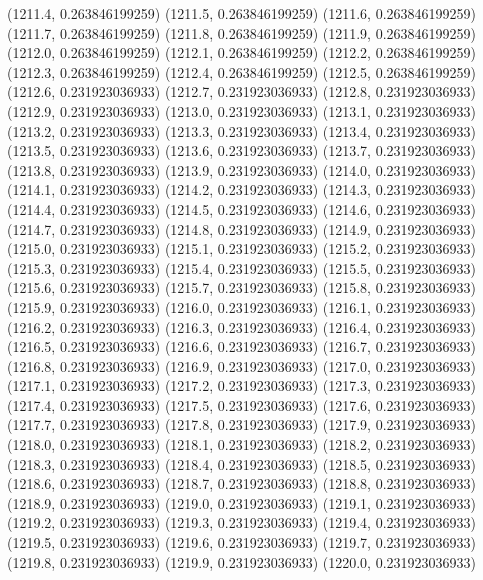 {					(1211.4, 0.263846199259)
					(1211.5, 0.263846199259)
					(1211.6, 0.263846199259)
					(1211.7, 0.263846199259)
					(1211.8, 0.263846199259)
					(1211.9, 0.263846199259)
					(1212.0, 0.263846199259)
					(1212.1, 0.263846199259)
					(1212.2, 0.263846199259)
					(1212.3, 0.263846199259)
					(1212.4, 0.263846199259)
					(1212.5, 0.263846199259)
					(1212.6, 0.231923036933)
					(1212.7, 0.231923036933)
					(1212.8, 0.231923036933)
					(1212.9, 0.231923036933)
					(1213.0, 0.231923036933)
					(1213.1, 0.231923036933)
					(1213.2, 0.231923036933)
					(1213.3, 0.231923036933)
					(1213.4, 0.231923036933)
					(1213.5, 0.231923036933)
					(1213.6, 0.231923036933)
					(1213.7, 0.231923036933)
					(1213.8, 0.231923036933)
					(1213.9, 0.231923036933)
					(1214.0, 0.231923036933)
					(1214.1, 0.231923036933)
					(1214.2, 0.231923036933)
					(1214.3, 0.231923036933)
					(1214.4, 0.231923036933)
					(1214.5, 0.231923036933)
					(1214.6, 0.231923036933)
					(1214.7, 0.231923036933)
					(1214.8, 0.231923036933)
					(1214.9, 0.231923036933)
					(1215.0, 0.231923036933)
					(1215.1, 0.231923036933)
					(1215.2, 0.231923036933)
					(1215.3, 0.231923036933)
					(1215.4, 0.231923036933)
					(1215.5, 0.231923036933)
					(1215.6, 0.231923036933)
					(1215.7, 0.231923036933)
					(1215.8, 0.231923036933)
					(1215.9, 0.231923036933)
					(1216.0, 0.231923036933)
					(1216.1, 0.231923036933)
					(1216.2, 0.231923036933)
					(1216.3, 0.231923036933)
					(1216.4, 0.231923036933)
					(1216.5, 0.231923036933)
					(1216.6, 0.231923036933)
					(1216.7, 0.231923036933)
					(1216.8, 0.231923036933)
					(1216.9, 0.231923036933)
					(1217.0, 0.231923036933)
					(1217.1, 0.231923036933)
					(1217.2, 0.231923036933)
					(1217.3, 0.231923036933)
					(1217.4, 0.231923036933)
					(1217.5, 0.231923036933)
					(1217.6, 0.231923036933)
					(1217.7, 0.231923036933)
					(1217.8, 0.231923036933)
					(1217.9, 0.231923036933)
					(1218.0, 0.231923036933)
					(1218.1, 0.231923036933)
					(1218.2, 0.231923036933)
					(1218.3, 0.231923036933)
					(1218.4, 0.231923036933)
					(1218.5, 0.231923036933)
					(1218.6, 0.231923036933)
					(1218.7, 0.231923036933)
					(1218.8, 0.231923036933)
					(1218.9, 0.231923036933)
					(1219.0, 0.231923036933)
					(1219.1, 0.231923036933)
					(1219.2, 0.231923036933)
					(1219.3, 0.231923036933)
					(1219.4, 0.231923036933)
					(1219.5, 0.231923036933)
					(1219.6, 0.231923036933)
					(1219.7, 0.231923036933)
					(1219.8, 0.231923036933)
					(1219.9, 0.231923036933)
					(1220.0, 0.231923036933)
}
